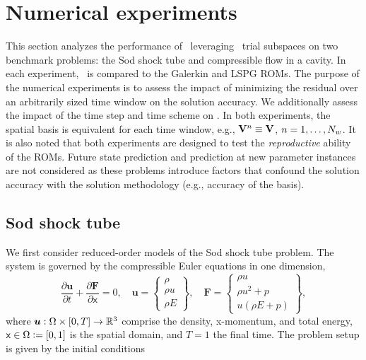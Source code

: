 \section{Numerical experiments}\label{sec:numerical_experiments}
This section analyzes the performance of \methodAcronymROMs\ leveraging \spatialAcronym\ trial subspaces on two benchmark problems: the Sod shock tube and compressible flow in a cavity. In each experiment, \methodAcronym\ is compared to the Galerkin and LSPG ROMs. The purpose of the numerical experiments is to assess the impact of minimizing the residual over an arbitrarily sized time window on the solution accuracy. We additionally assess the impact of the time step and time scheme on \methodAcronym. In both experiments, the spatial basis is equivalent for each time window, e.g., $\mathbf {V}^{n} \equiv \mathbf {V}$, $n=1,\ldots,N_w$. It is also noted that both experiments are designed to test the \textit{reproductive} ability of the ROMs. Future state prediction and prediction at new parameter instances are not considered as these problems introduce factors that confound the solution accuracy with the solution methodology (e.g., accuracy of the basis). 
 
\subsection{Sod shock tube}
We first consider reduced-order models of the Sod shock tube problem. The system is governed by the compressible Euler equations in one dimension, 
\begin{equation}\label{eq:euler_1D}
    \frac{\partial \boldsymbol u}{\partial t} + \frac{\partial \boldsymbol F}{\partial \mathsf{x}} = 0, \quad
    \boldsymbol u= 
    \begin{Bmatrix} \rho \\ \rho u \\ \rho E \end{Bmatrix}, \quad 
    \boldsymbol F = \begin{Bmatrix} \rho u \\ \rho u^2 + p \\  u(\rho E + p) \end{Bmatrix},
\end{equation}
where $\boldsymbol u : \Omega \times [0,T] \rightarrow \mathbb{R}^{3}$ comprise the density, x-momentum, and total energy, $\mathsf{x} \in \Omega \vcentcolon=  [0,1]$ is the spatial domain, and 
$T = 1$ the final time. 
The problem setup is given by the initial conditions

